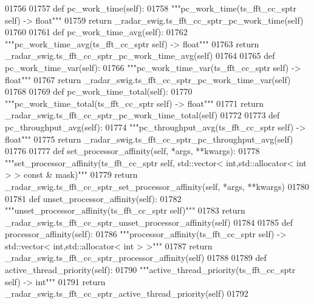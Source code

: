 \begin{DoxyCode}
{{{{{{{01756 
01757     \textcolor{keyword}{def }pc_work_time(self):
01758         \textcolor{stringliteral}{"""pc\_work\_time(ts\_fft\_cc\_sptr self) -> float"""}
01759         \textcolor{keywordflow}{return} \_radar\_swig.ts\_fft\_cc\_sptr\_pc\_work\_time(self)
01760 
01761     \textcolor{keyword}{def }pc_work_time_avg(self):
01762         \textcolor{stringliteral}{"""pc\_work\_time\_avg(ts\_fft\_cc\_sptr self) -> float"""}
01763         \textcolor{keywordflow}{return} \_radar\_swig.ts\_fft\_cc\_sptr\_pc\_work\_time\_avg(self)
01764 
01765     \textcolor{keyword}{def }pc_work_time_var(self):
01766         \textcolor{stringliteral}{"""pc\_work\_time\_var(ts\_fft\_cc\_sptr self) -> float"""}
01767         \textcolor{keywordflow}{return} \_radar\_swig.ts\_fft\_cc\_sptr\_pc\_work\_time\_var(self)
01768 
01769     \textcolor{keyword}{def }pc_work_time_total(self):
01770         \textcolor{stringliteral}{"""pc\_work\_time\_total(ts\_fft\_cc\_sptr self) -> float"""}
01771         \textcolor{keywordflow}{return} \_radar\_swig.ts\_fft\_cc\_sptr\_pc\_work\_time\_total(self)
01772 
01773     \textcolor{keyword}{def }pc_throughput_avg(self):
01774         \textcolor{stringliteral}{"""pc\_throughput\_avg(ts\_fft\_cc\_sptr self) -> float"""}
01775         \textcolor{keywordflow}{return} \_radar\_swig.ts\_fft\_cc\_sptr\_pc\_throughput\_avg(self)
01776 
01777     \textcolor{keyword}{def }set_processor_affinity(self, *args, **kwargs):
01778         \textcolor{stringliteral}{"""set\_processor\_affinity(ts\_fft\_cc\_sptr self, std::vector< int,std::allocator< int > > const &
       mask)"""}
01779         \textcolor{keywordflow}{return} \_radar\_swig.ts\_fft\_cc\_sptr\_set\_processor\_affinity(self, *args, **kwargs)
01780 
01781     \textcolor{keyword}{def }unset_processor_affinity(self):
01782         \textcolor{stringliteral}{"""unset\_processor\_affinity(ts\_fft\_cc\_sptr self)"""}
01783         \textcolor{keywordflow}{return} \_radar\_swig.ts\_fft\_cc\_sptr\_unset\_processor\_affinity(self)
01784 
01785     \textcolor{keyword}{def }processor_affinity(self):
01786         \textcolor{stringliteral}{"""processor\_affinity(ts\_fft\_cc\_sptr self) -> std::vector< int,std::allocator< int > >"""}
01787         \textcolor{keywordflow}{return} \_radar\_swig.ts\_fft\_cc\_sptr\_processor\_affinity(self)
01788 
01789     \textcolor{keyword}{def }active_thread_priority(self):
01790         \textcolor{stringliteral}{"""active\_thread\_priority(ts\_fft\_cc\_sptr self) -> int"""}
01791         \textcolor{keywordflow}{return} \_radar\_swig.ts\_fft\_cc\_sptr\_active\_thread\_priority(self)
01792 
}}}}}}}
\end{DoxyCode}
